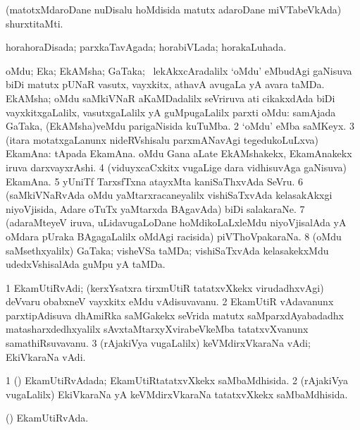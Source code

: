 \bentry
{}
\gl{\nA}
\expl{}
\bmng
(matotxMdaroDane nuDisalu hoMdisida matutx adaroDane miVTabeVkAda) shurxtitaMti. 
\emng
\eentry

\bentry
{} 
\gl{\gu}
\expl{}
\bmng
horahoraDisada; parxkaTavAgada; horabiVLada; horakaLuhada. 
\emng
\eentry

\bentry
{} 
\gl{\nA}
\expl{}
\bmng
\bnum
{} 
\banum
{} oMdu; Eka; EkAMsha; GaTaka; \kanmu\ lekAkxcAradalilx `oMdu' eMbudAgi gaNisuva biDi matutx pUNaR vasutx, vayxkitx, athavA avugaLa yA avara taMDa. 
 EkAMsha; oMdu saMkiVNaR aKaMDadalilx seVriruva ati cikakxdAda biDi vayxkitxgaLalilx, vasutxgaLalilx yA guMpugaLalilx parxti oMdu:  samAjada GaTaka, (EkAMsha)veMdu parigaNisida kuTuMba. 
\eanum
\numie
\num{2} `oMdu' eMba saMKeyx. 
\num{3} (itara motatxgaLanunx nideRVshisalu parxmANavAgi tegedukoLuLxva) EkamAna:  tApada EkamAna.  oMdu Gana aLate EkAMshakekx, EkamAnakekx iruva darxvayxrAshi. 
\num{4} (viduyxcaCxkitx \mo vugaLige dara vidhisuvAga gaNisuva) EkamAna. 
\num{5} yUniTf TarxsfTxna atayxMta kaniSaThxvAda SeVru. 
\num{6} (saMkiVNaRvAda oMdu yaMtarxracaneyalilx vishiSaTxvAda kelasakAkxgi niyoVjisida, Adare oTuTx yaMtarxda BAgavAda) biDi salakaraNe. 
\num{7} (adaraMteyeV iruva, uLidavugaLoDane hoMdikoLaLxleMdu niyoVjisalAda yA oMdara pUraka BAgagaLalilx oMdAgi racisida) piVThoVpakaraNa. 
\num{8} (oMdu saMsethxyalilx) GaTaka; visheVSa taMDa; vishiSaTxvAda kelasakekxMdu udedxVshisalAda guMpu yA taMDa. 
\enum
\emng
\eentry

\bentry
{} 
\gl{\nA}
\expl{}
\bmng
\bnum
\num{1} EkamUtiRvAdi; (kerxYsatxra tirxmUtiR tatatxvXkekx virudadhxvAgi) deVvaru obabxneV vayxkitx eMdu vAdisuvavanu. 
\num{2} EkamUtiR vAdavanunx parxtipAdisuva dhAmiRka saMGakekx seVrida matutx saMparxdAyabadadhx matasharxdedhxyalilx sAvxtaMtarxyXvirabeVkeMba tatatxvXvanunx samathiRsuvavanu. 
\num{3} (rAjakiVya \mo vugaLalilx) keVMdirxVkaraNa vAdi; EkiVkaraNa vAdi. 
\enum
\emng
\eentry

\bentry
{} 
\gl{\gu}
\expl{}
\bmng
\bnum
\num{1} (\kerxY) EkamUtiRvAdada; EkamUtiRtatatxvXkekx saMbaMdhisida. 
\num{2} (rAjakiVya \mo vugaLalilx) EkiVkaraNa yA keVMdirxVkaraNa tatatxvXkekx saMbaMdhisida. 
\enum
\emng
\eentry

\bentry
{} 
\gl{\nA}
\expl{}
\bmng
(\kerxY) EkamUtiRvAda. 
\emng
\eentry

